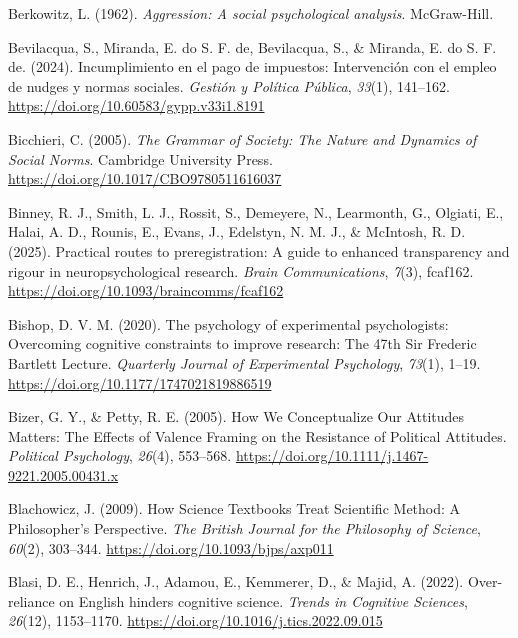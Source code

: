 \documentclass[
  letterpaper,
]{book}
\newlength{\cslhangindent}
\newenvironment{CSLReferences}[2] %
 {\begin{list}{}{%
  \setlength{\itemindent}{0pt}
  \setlength{\leftmargin}{0pt}
  \setlength{\parsep}{0pt}
  \ifodd #1
   \setlength{\leftmargin}{\cslhangindent}
   \setlength{\itemindent}{-1\cslhangindent}
  \fi
  \setlength{\itemsep}{#2\baselineskip}}}
 {\end{list}}
\begin{document}
\begin{CSLReferences}{1}{0}
Berkowitz, L. (1962). \emph{Aggression: {A} social psychological
analysis}. McGraw-Hill.

Bevilacqua, S., Miranda, E. do S. F. de, Bevilacqua, S., \& Miranda, E.
do S. F. de. (2024). Incumplimiento en el pago de impuestos:
{Intervención} con el empleo de nudges y normas sociales. \emph{Gestión
y Política Pública}, \emph{33}(1), 141--162.
\url{https://doi.org/10.60583/gypp.v33i1.8191}

Bicchieri, C. (2005). \emph{The {Grammar} of {Society}: {The} {Nature}
and {Dynamics} of {Social} {Norms}}. Cambridge University Press.
\url{https://doi.org/10.1017/CBO9780511616037}

Binney, R. J., Smith, L. J., Rossit, S., Demeyere, N., Learmonth, G.,
Olgiati, E., Halai, A. D., Rounis, E., Evans, J., Edelstyn, N. M. J., \&
McIntosh, R. D. (2025). Practical routes to preregistration: A guide to
enhanced transparency and rigour in neuropsychological research.
\emph{Brain Communications}, \emph{7}(3), fcaf162.
\url{https://doi.org/10.1093/braincomms/fcaf162}

Bishop, D. V. M. (2020). The psychology of experimental psychologists:
{Overcoming} cognitive constraints to improve research: {The} 47th {Sir}
{Frederic} {Bartlett} {Lecture}. \emph{Quarterly Journal of Experimental
Psychology}, \emph{73}(1), 1--19.
\url{https://doi.org/10.1177/1747021819886519}

Bizer, G. Y., \& Petty, R. E. (2005). How {We} {Conceptualize} {Our}
{Attitudes} {Matters}: {The} {Effects} of {Valence} {Framing} on the
{Resistance} of {Political} {Attitudes}. \emph{Political Psychology},
\emph{26}(4), 553--568.
\url{https://doi.org/10.1111/j.1467-9221.2005.00431.x}

Blachowicz, J. (2009). How {Science} {Textbooks} {Treat} {Scientific}
{Method}: {A} {Philosopher}'s {Perspective}. \emph{The British Journal
for the Philosophy of Science}, \emph{60}(2), 303--344.
\url{https://doi.org/10.1093/bjps/axp011}

Blasi, D. E., Henrich, J., Adamou, E., Kemmerer, D., \& Majid, A.
(2022). Over-reliance on {English} hinders cognitive science.
\emph{Trends in Cognitive Sciences}, \emph{26}(12), 1153--1170.
\url{https://doi.org/10.1016/j.tics.2022.09.015}


\end{CSLReferences}
\end{document}
